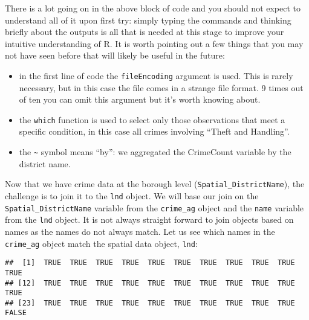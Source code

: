 \documentclass[]{article}
\newenvironment{Shaded}{}{}
\newcommand{\StringTok}[1]{\textcolor[rgb]{0.25,0.44,0.63}{{#1}}}
\newcommand{\CommentTok}[1]{\textcolor[rgb]{0.38,0.63,0.69}{\textit{{#1}}}}
\newcommand{\NormalTok}[1]{{#1}}
\begin{document}
There is a lot going on in the above block of code and you should not
expect to understand all of it upon first try: simply typing the
commands and thinking briefly about the outputs is all that is needed at
this stage to improve your intuitive understanding of R. It is worth
pointing out a few things that you may not have seen before that will
likely be useful in the future:

\begin{itemize}
\itemsep1pt\parskip0pt
\item
  in the first line of code the \texttt{fileEncoding} argument is used.
  This is rarely necessary, but in this case the file comes in a strange
  file format. 9 times out of ten you can omit this argument but it's
  worth knowing about.
\item
  the \texttt{which} function is used to select only those observations
  that meet a specific condition, in this case all crimes involving
  ``Theft and Handling''.
\item
  the \texttt{\textasciitilde{}} symbol means ``by'': we aggregated the
  CrimeCount variable by the district name.
\end{itemize}

Now that we have crime data at the borough level
(\texttt{Spatial\_DistrictName}), the challenge is to join it to the
\texttt{lnd} object. We will base our join on the
\texttt{Spatial\_DistrictName} variable from the \texttt{crime\_ag}
object and the \texttt{name} variable from the \texttt{lnd} object. It
is not always straight forward to join objects based on names as the
names do not always match. Let us see which names in the
\texttt{crime\_ag} object match the spatial data object, \texttt{lnd}:

\begin{Shaded}
\end{Shaded}

\begin{verbatim}
##  [1]  TRUE  TRUE  TRUE  TRUE  TRUE  TRUE  TRUE  TRUE  TRUE  TRUE  TRUE
## [12]  TRUE  TRUE  TRUE  TRUE  TRUE  TRUE  TRUE  TRUE  TRUE  TRUE  TRUE
## [23]  TRUE  TRUE  TRUE  TRUE  TRUE  TRUE  TRUE  TRUE  TRUE  TRUE FALSE
\end{verbatim}
\end{document}
